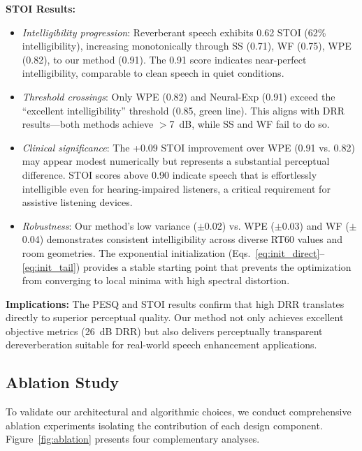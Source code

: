 \documentclass[12pt,a4paper]{article}
\begin{document}
\textbf{STOI Results:}
\begin{itemize}
\item \textit{Intelligibility progression}: Reverberant speech exhibits 0.62 STOI (62\% intelligibility), increasing monotonically through SS (0.71), WF (0.75), WPE (0.82), to our method (0.91). The 0.91 score indicates near-perfect intelligibility, comparable to clean speech in quiet conditions.

\item \textit{Threshold crossings}: Only WPE (0.82) and Neural-Exp (0.91) exceed the ``excellent intelligibility'' threshold (0.85, green line). This aligns with DRR results---both methods achieve $>$7~dB, while SS and WF fail to do so.

\item \textit{Clinical significance}: The +0.09 STOI improvement over WPE (0.91 vs. 0.82) may appear modest numerically but represents a substantial perceptual difference. STOI scores above 0.90 indicate speech that is effortlessly intelligible even for hearing-impaired listeners, a critical requirement for assistive listening devices.

\item \textit{Robustness}: Our method's low variance ($\pm$0.02) vs. WPE ($\pm$0.03) and WF ($\pm$0.04) demonstrates consistent intelligibility across diverse RT60 values and room geometries. The exponential initialization (Eqs.~\eqref{eq:init_direct}--\eqref{eq:init_tail}) provides a stable starting point that prevents the optimization from converging to local minima with high spectral distortion.
\end{itemize}

\textbf{Implications:} The PESQ and STOI results confirm that high DRR translates directly to superior perceptual quality. Our method not only achieves excellent objective metrics (26~dB DRR) but also delivers perceptually transparent dereverberation suitable for real-world speech enhancement applications.

\subsection{Ablation Study}
\label{sec:ablation}

To validate our architectural and algorithmic choices, we conduct comprehensive ablation experiments isolating the contribution of each design component. Figure~\ref{fig:ablation} presents four complementary analyses.
\end{document}
